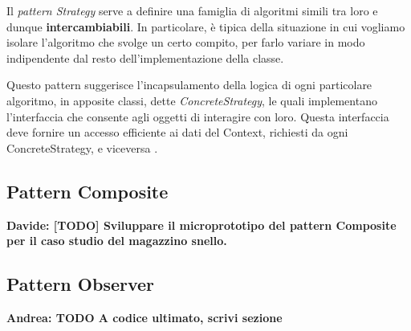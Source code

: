 \documentclass[12pt]{article}
\newcommand{\andrea}[1]{{\bf \color{mauve} Andrea: #1 }}
\newcommand{\davide}[1]{{\bf \color{chromeyellow} Davide: #1 }}
\begin{document}
Il {\em pattern Strategy} serve a definire una famiglia di algoritmi simili tra loro e dunque \textbf{intercambiabili}. In particolare, è tipica della situazione in cui vogliamo isolare l’algoritmo che svolge un certo compito, per farlo variare in modo indipendente dal resto dell’implementazione della classe.

Questo pattern suggerisce l’incapsulamento della logica di ogni
particolare algoritmo, in apposite classi, dette {\em ConcreteStrategy}, le quali implementano l’interfaccia che consente agli oggetti di interagire con loro. Questa interfaccia deve fornire un accesso efficiente ai dati del Context, richiesti da ogni ConcreteStrategy, e viceversa \cite{gof_sunt}.


\subsection{Pattern Composite}

\davide{\textbf{[TODO]} Sviluppare il microprototipo del pattern Composite per il caso studio del magazzino snello.}

\subsection{Pattern Observer}

\andrea{\textbf{TODO} A codice ultimato, scrivi sezione}


\newpage

\printbibliography
\end{document}
